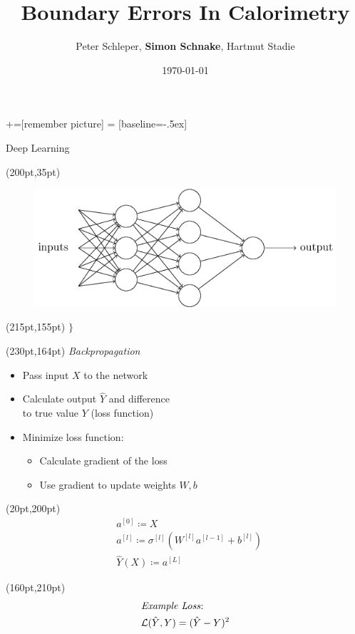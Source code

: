 \documentclass[10pt]{beamer}
\title{Boundary Errors In Calorimetry}
\date{\today}
\author{Peter Schleper, \textbf{Simon Schnake}, Hartmut Stadie}
\institute{Universität Hamburg}
\begin{document}
\maketitle
{}+=[remember picture]
 = [baseline=-.5ex]


\begin{frame}{Deep Learning}
  \begin{textblock*}{150pt}(200pt,35pt)
    \begin{figure}[htp]
      \includegraphics[width=\textwidth]{../images/tikz1.png}
    \end{figure}
  \end{textblock*}
  \begin{textblock*}{150pt}(215pt,155pt)
    \Huge{$\}$}
  \end{textblock*}
  \begin{textblock*}{150pt}(230pt,164pt)
    \emph{Backpropagation}
  \end{textblock*}
  \begin{itemize}
  \item Pass input $X$ to the network
  \item Calculate output $\hat{Y}$ and difference\\ to true value $Y$ (loss function)
  \item Minimize loss function:
    \begin{itemize}
    \item Calculate gradient of the loss
    \item Use gradient to update weights $W, b$
    \end{itemize}
  \end{itemize}
  \begin{textblock*}{150pt}(20pt,200pt)
    \begin{align*}
      &a^{[0]} \coloneqq X \\
      &a^{[l]} \coloneqq \sigma^{[l]}(W^{[l]} a^{[l-1]}+ b^{[l]})\\
      &\hat{Y}(X) \coloneqq a^{[L]}
    \end{align*}
  \end{textblock*}

  \begin{textblock*}{170pt}(160pt,210pt)
    \begin{align*}
      &\text{\emph{Example Loss}:}\\
      &\mathcal{L}(\hat{Y}, Y) = (\hat{Y} - Y)^2
    \end{align*}
  \end{textblock*}
\end{frame}
\end{document}
